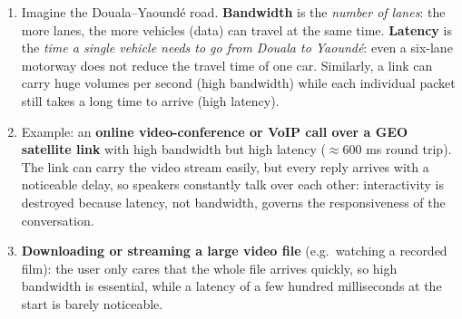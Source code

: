 \documentclass[11pt]{article}
\begin{document}
\begin{corrige}
\begin{enumerate}
\item Imagine the Douala--Yaound\'e road. \textbf{Bandwidth} is the \emph{number of lanes}: the more lanes, the more vehicles (data) can travel at the same time. \textbf{Latency} is the \emph{time a single vehicle needs to go from Douala to Yaound\'e}: even a six-lane motorway does not reduce the travel time of one car. Similarly, a link can carry huge volumes per second (high bandwidth) while each individual packet still takes a long time to arrive (high latency).
\item Example: an \textbf{online video-conference or VoIP call over a GEO satellite link} with high bandwidth but high latency ($\approx 600$ ms round trip). The link can carry the video stream easily, but every reply arrives with a noticeable delay, so speakers constantly talk over each other: interactivity is destroyed because latency, not bandwidth, governs the responsiveness of the conversation.
\item \textbf{Downloading or streaming a large video file} (e.g.\ watching a recorded film): the user only cares that the whole file arrives quickly, so high bandwidth is essential, while a latency of a few hundred milliseconds at the start is barely noticeable.
\end{enumerate}
\end{corrige}
\end{document}
